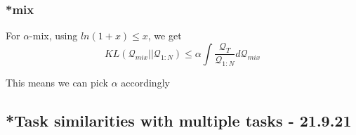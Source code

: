 \documentclass[letterpaper]{article}
\theoremstyle{definition}
\newtheorem{assumption}{Assumption}
\begin{document}
%
% 
%



\subsubsection{*mix}

For $\alpha$-mix, using $ln(1+x)\leq x$, we get 
$$KL(\mathcal{Q}_{mix}||\mathcal{Q}_{1:N})\leq \alpha\int \frac{\mathcal{Q}_{T}}{\mathcal{Q}_{1:N}}d\mathcal{Q}_{mix} $$

This means we can pick $\alpha$ accordingly


\subsection{*Task similarities with multiple tasks - 21.9.21}

%
%	
%
%
%
\end{document}
